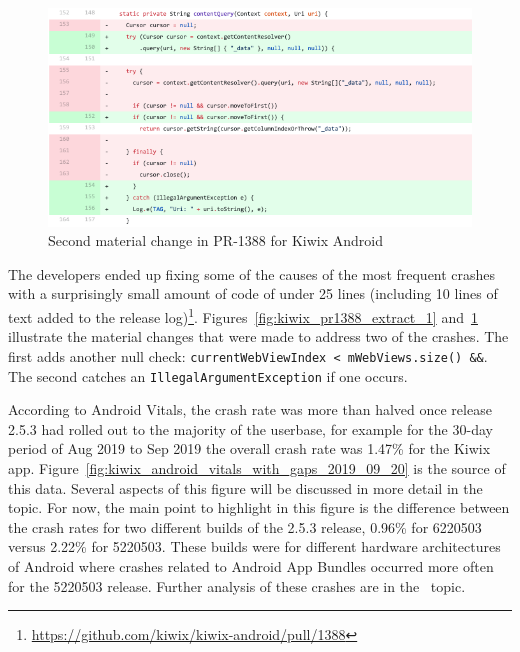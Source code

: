 \begin{figure}
    \centering
    \includegraphics[width=14cm]{images/github/kiwix-pr1388-extract-2.png}
    \caption{Second material change in PR-1388 for Kiwix Android}
    \label{fig:kiwix_pr1388_extract_2}
\end{figure}


The developers ended up fixing some of the causes of the most frequent crashes with a surprisingly small amount of code of under 25 lines (including 10 lines of text added to the release log)\footnote{\url{https://github.com/kiwix/kiwix-android/pull/1388}}. Figures~\ref{fig:kiwix_pr1388_extract_1} and~\ref{fig:kiwix_pr1388_extract_2} illustrate the material changes that were made to address two of the crashes. The first adds another null check: \small{\texttt{currentWebViewIndex < mWebViews.size() \&\&}}. 
The second catches an \texttt{IllegalArgumentException} if one occurs. 

According to Android Vitals, the crash rate was more than halved once release 2.5.3 had rolled out to the majority of the userbase, for example for the 30-day period of  Aug 2019 to  Sep 2019 the overall crash rate was 1.47\% for the Kiwix app. Figure~\ref{fig:kiwix_android_vitals_with_gaps_2019_09_20} is the source of this data. Several aspects of this figure will be discussed in more detail in the \href{section-flaws-in-the-analytics}{} topic. For now, the main point to highlight in this figure is the difference between the crash rates for two different builds of the 2.5.3 release, 0.96\% for 6220503 versus 2.22\% for 5220503. These builds were for different hardware architectures of Android where crashes related to Android App Bundles occurred more often for the 5220503 release. Further analysis of these crashes are in the~\href{kiwix-android-app-bundling-crashes}{} topic.  

